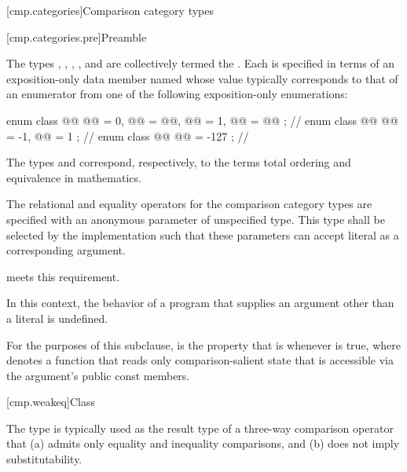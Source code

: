 [cmp.categories]{Comparison category types}

[cmp.categories.pre]{Preamble}

\pnum
The types
,
,
,
, and
are collectively termed the .
Each is specified in terms of an exposition-only data member named 
whose value typically corresponds to that of an enumerator
from one of the following exposition-only enumerations:

\begin{codeblock}
enum class @@ { @@ = 0, @@ = @@,
                @@ = 1, @@ = @@ };   // \expos
enum class @@ { @@ = -1, @@ = 1 };                  // \expos
enum class @@ { @@ = -127 };                       // \expos
\end{codeblock}

\pnum
\begin{note}
The types  and 
correspond, respectively, to the terms
total ordering and equivalence in mathematics.
\end{note}

\pnum
The relational and equality operators for the comparison category types
are specified with an anonymous parameter of unspecified type.
This type shall be selected by the implementation such that
these parameters can accept literal  as a corresponding argument.
\begin{example}
meets this requirement.
\end{example}
In this context, the behavior of a program that supplies
an argument other than a literal  is undefined.

\pnum
For the purposes of this subclause,
 is the property that  is 
whenever  is true,
where  denotes a function that reads only comparison-salient state
that is accessible via the argument's public const members.

[cmp.weakeq]{Class }

\pnum
The  type is typically used
as the result type of a three-way comparison operator
that (a) admits only equality and inequality comparisons,
and (b) does not imply substitutability.

